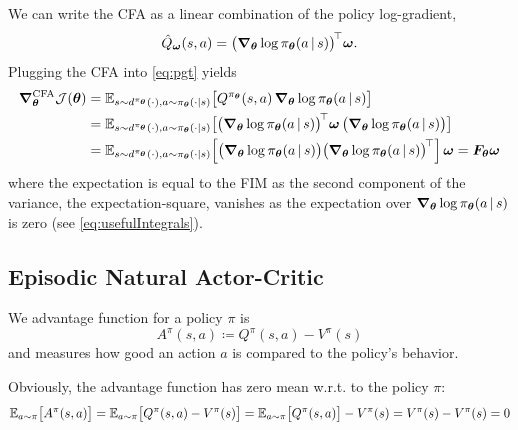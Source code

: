 			We can write the \ac{CFA} as a linear combination of the policy log-gradient,
			\begin{equation}
				\hat{Q}_{\bm{\omega}}(s, a) = \bigl( \grad_{\bm{\theta}} \log \pi_{\bm{\theta}}(a \,\vert\, s) \bigr)^{{\!\top\!}\,} \bm{\omega}.
			\end{equation}
			Plugging the \ac{CFA} into \eqref{eq:pgt} yields
			\begin{align}
				\grad_{\bm{\theta}}^\mathrm{CFA} \mathcal{J}(\bm{\theta})
					&= \mathbb{E}_{s \sim d^{\pi_{\bm{\theta}}}(\cdot), a \sim \pi_{\bm{\theta}}(\cdot \vert s)}\bigl[ Q^{\pi_{\bm{\theta}}}(s, a) \, \grad_{\bm{\theta}} \log \pi_{\bm{\theta}}(a \,\vert\, s) \bigr] \\
					&= \mathbb{E}_{s \sim d^{\pi_{\bm{\theta}}}(\cdot), a \sim \pi_{\bm{\theta}}(\cdot \vert s)}\bigl[ \bigl( \grad_{\bm{\theta}} \log \pi_{\bm{\theta}}(a \,\vert\, s) \bigr)^{{\!\top\!}\,} \bm{\omega} \, \bigl( \grad_{\bm{\theta}} \log \pi_{\bm{\theta}}(a \,\vert\, s) \bigr) \bigr] \\
					&= \mathbb{E}_{s \sim d^{\pi_{\bm{\theta}}}(\cdot), a \sim \pi_{\bm{\theta}}(\cdot \vert s)}\Bigl[ \bigl( \grad_{\bm{\theta}} \log \pi_{\bm{\theta}}(a \,\vert\, s) \bigr) \bigl( \grad_{\bm{\theta}} \log \pi_{\bm{\theta}}(a \,\vert\, s) \bigr)^{{\!\top\!}\,} \Bigr] \, \bm{\omega}
					 = \bm{F}_{\bm{\theta}} \bm{\omega}
			\end{align}
			where the expectation is equal to the \ac{FIM} as the second component of the variance, the expectation-square, vanishes as the expectation over \( \grad_{\bm{\theta}} \log \pi_{\bm{\theta}}(a \,\vert\, s) \) is zero (see \eqref{eq:usefulIntegrals}).

		\subsection{Episodic Natural Actor-Critic}
			\begin{definition}
				We advantage function for a policy \(\pi\) is
				\begin{equation}
					A^\pi(s, a) \coloneqq Q^\pi(s, a) - V^\pi(s)
				\end{equation}
				and measures how good an action \(a\) is compared to the policy's behavior.
			\end{definition}
			Obviously, the advantage function has zero mean w.r.t. to the policy \(\pi\):
			\begin{equation}
				\mathbb{E}_{a \sim \pi}\bigl[ A^\pi(s, a) \bigr]
					= \mathbb{E}_{a \sim \pi}\bigl[ Q^\pi(s, a) - V^\pi(s) \bigr]
					= \mathbb{E}_{a \sim \pi}\bigl[ Q^\pi(s, a) \bigr] - V^\pi(s)
					= V^\pi(s) - V^\pi(s)
					= 0
			\end{equation}


